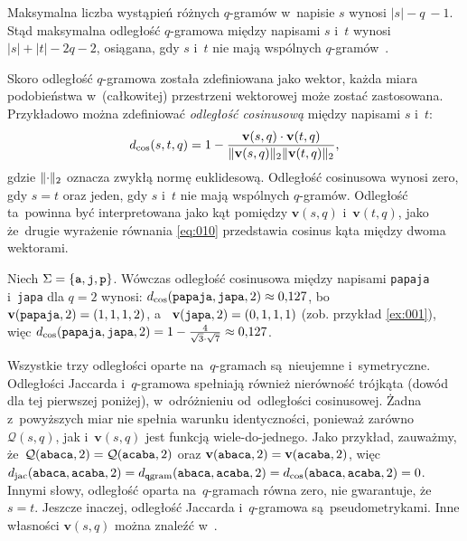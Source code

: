 \documentclass{praca1}
\DeclarePairedDelimiter{\norm}{\lVert}{\rVert}
\begin{document}

Maksymalna liczba wystąpień różnych $q$-gramów w~napisie $s$ wynosi $|s| - q~- 1$. Stąd maksymalna odległość $q$-gramowa między napisami $s$ i~$t$ wynosi $|s| + |t| - 2q - 2$, osiągana, gdy $s$ i~$t$ nie mają wspólnych $q$-gramów~\cite{Loo2014:stringdist}.

Skoro odległość $q$-gramowa została zdefiniowana jako wektor, każda miara podobieństwa w~(całkowitej) przestrzeni wektorowej może zostać zastosowana. Przykładowo można zdefiniować \emph{odległość cosinusową} między napisami $s$ i~$t$:
\begin{equation}
\label{eq:010}
d_{\mathrm{cos}}(s,t,q) = 1 - \frac{ \mathbf{v}(s,q) \cdot \mathbf{v}(t,q) }{ \norm{\mathbf{v}(s,q)}_2  \norm{\mathbf{v}(t,q)}_2 },
\end{equation}
gdzie $\norm{\cdot}_2$ oznacza zwykłą normę euklidesową. Odległość cosinusowa wynosi zero, gdy $s=t$ oraz jeden, gdy $s$ i~$t$ nie mają wspólnych $q$-gramów. Odległość ta~powinna być interpretowana jako kąt pomiędzy $\mathbf{v}(s,q)$ i~$\mathbf{v}(t,q)$, jako że~drugie wyrażenie równania \eqref{eq:010} przedstawia cosinus kąta między dwoma wektorami.

\begin{example}
Niech $\Sigma = \{\verb|a|, \verb|j|, \verb|p|\}$. Wówczas odległość cosinusowa między napisami \verb|papaja| i~\verb|japa| dla $q = 2$ wynosi: $d_{\mathrm{cos}}(\verb|papaja|, \verb|japa|, 2) \approx 0{,}127$, bo~$\mathbf{v}( \verb|papaja|,2) = (1, 1, 1, 2)$, a~ $\mathbf{v}( \verb|japa|,2) = (0, 1, 1, 1)$ (zob. przykład \ref{ex:001}), więc $d_{\mathrm{cos}}(\verb|papaja|, \verb|japa|, 2) = 1 - \frac{4}{\sqrt{3}\cdot\sqrt{7}} \approx 0{,}127$.
\end{example}

Wszystkie trzy odległości oparte na~$q$-gramach są~nieujemne i~symetryczne. Odległości Jaccarda i~$q$-gramowa spełniają również nierówność trójkąta (dowód dla tej pierwszej poniżej), w~odróżnieniu od~odległości cosinusowej. Żadna z~powyższych miar nie spełnia warunku identyczności, ponieważ zarówno $\mathcal{Q}(s,q)$, jak i~$\mathbf{v}(s,q)$ jest funkcją wiele-do-jednego. Jako przykład, zauważmy, że~$\mathcal{Q}(\verb|abaca|,2) = \mathcal{Q}(\verb|acaba|,2)$ oraz $\mathbf{v}(\verb|abaca|,2) = \mathbf{v}(\verb|acaba|,2)$, więc $d_{\mathrm{jac}}(\verb|abaca|, \verb|acaba|, 2) = d_{\mathtt{q}\mathrm{gram}}(\verb|abaca|, \verb|acaba|, 2) = d_{\mathrm{cos}}(\verb|abaca|, \verb|acaba|, 2) = 0$. Innymi słowy, odległość oparta na~$q$-gramach równa zero, nie gwarantuje, że~$s = t$. Jeszcze inaczej, odległość Jaccarda i~$q$-gramowa są~pseudometrykami. Inne własności $\mathbf{v}(s,q)$ można znaleźć w~\cite{Ukkonen1992:approxqgrams}.
\end{document}
